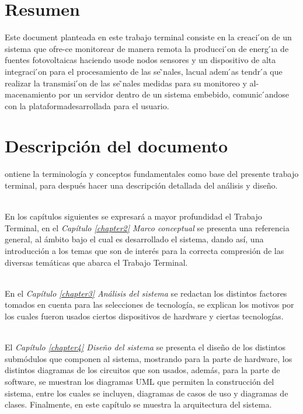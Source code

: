 \section{Resumen}
Este document planteada en este trabajo terminal consiste en la creaci ́on de un sistema que ofre-ce monitorear de manera remota la producci ́on de energ ́ıa de fuentes fotovoltaicas haciendo usode  nodos  sensores  y  un  dispositivo  de  alta  integraci ́on  para  el  procesamiento  de  las  se ̃nales,  lacual adem ́as tendr ́a que realizar la transmisi ́on de las se ̃nales medidas para su monitoreo y al-macenamiento por un servidor dentro de un sistema embebido, comunic ́andose con la plataformadesarrollada para el usuario.


\section{Descripción del documento}
ontiene la terminología y conceptos fundamentales como base del presente trabajo terminal, para después hacer una descripción detallada del análisis y diseño. 

\\
En los capítulos siguientes se expresará a mayor profundidad el Trabajo Terminal, en el \textit{Capítulo \ref{chapter2} Marco conceptual} se presenta una referencia general, al ámbito bajo el cual es desarrollado el sistema, dando así, una introducción a los temas que son de interés para la correcta compresión de las diversas temáticas que abarca el Trabajo Terminal.

\\
En el \textit{Capítulo \ref{chapter3} Análisis del sistema} se redactan los distintos factores tomados en cuenta para las selecciones de tecnología, se explican los motivos por los cuales fueron usados ciertos dispositivos de hardware y ciertas tecnologías.

\\
El \textit{Capítulo \ref{chapter4} Diseño del sistema} se presenta el diseño de los distintos submódulos que componen al sistema, mostrando para la parte de hardware, los distintos diagramas de los circuitos que son usados, además, para la parte de software, se muestran los diagramas UML que permiten la construcción del sistema, entre los cuales se incluyen, diagramas de casos de uso y diagramas de clases. Finalmente, en este capítulo se muestra la arquitectura del sistema. %
\\

